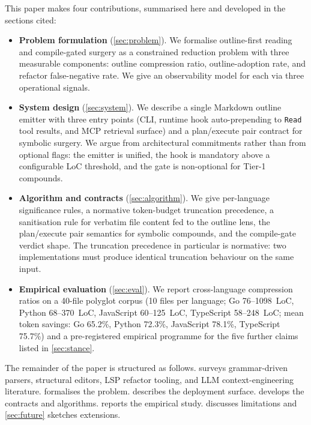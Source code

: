 This paper makes four contributions, summarised here and developed in
the sections cited:

\begin{itemize}[leftmargin=*]
  \item \textbf{Problem formulation} (\cref{sec:problem}). We
        formalise outline-first reading and compile-gated surgery
        as a constrained reduction problem with three measurable
        components: outline compression ratio, outline-adoption
        rate, and refactor false-negative rate. We give an
        observability model for each via three operational signals.
  \item \textbf{System design} (\cref{sec:system}). We describe a
        single Markdown outline emitter with three entry points
        (CLI, runtime hook auto-prepending to \texttt{Read} tool
        results, and MCP retrieval surface) and a plan/execute pair
        contract for symbolic surgery. We argue from architectural
        commitments rather than from optional flags: the emitter is
        unified, the hook is mandatory above a configurable LoC
        threshold, and the gate is non-optional for Tier-1
        compounds.
  \item \textbf{Algorithm and contracts} (\cref{sec:algorithm}). We
        give per-language significance rules, a normative
        token-budget truncation precedence, a sanitisation rule for
        verbatim file content fed to the outline lens, the
        plan/execute pair semantics for symbolic compounds, and the
        compile-gate verdict shape. The truncation precedence in
        particular is normative: two implementations must produce
        identical truncation behaviour on the same input.
  \item \textbf{Empirical evaluation} (\cref{sec:eval}). We report
        cross-language compression ratios on a 40-file polyglot
        corpus (10 files per language; Go 76--1098~LoC,
        Python 68--370~LoC, JavaScript 60--125~LoC,
        TypeScript 58--248~LoC;
        mean token savings: Go 65.2\%, Python 72.3\%,
        JavaScript 78.1\%, TypeScript 75.7\%) and a pre-registered
        empirical programme for the five further claims listed in
        \cref{sec:stance}.
\end{itemize}

The remainder of the paper is structured as follows.
 surveys grammar-driven parsers, structural
editors, LSP refactor tooling, and LLM context-engineering
literature.  formalises the problem.
 describes the deployment surface.
 develops the contracts and algorithms.
 reports the empirical study.
 discusses limitations and
\cref{sec:future} sketches extensions.
